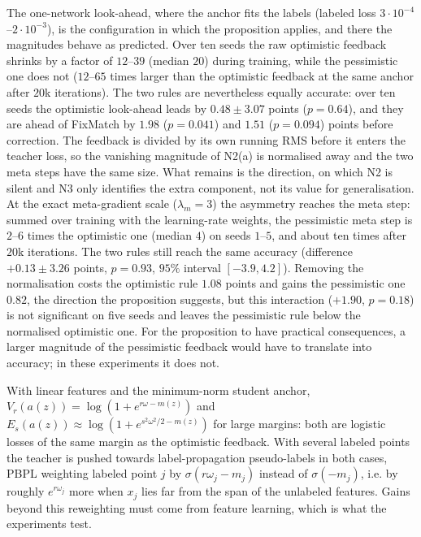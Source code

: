 The one-network look-ahead, where the anchor fits the labels (labeled loss
$3\cdot10^{-4}$--$2\cdot10^{-3}$), is the configuration in which the proposition applies, and
there the magnitudes behave as predicted. Over ten seeds the raw optimistic feedback shrinks by a
factor of $12$--$39$ (median $20$) during training, while the pessimistic one does not
($12$--$65$ times larger than the optimistic feedback at the same anchor after $20$k
iterations). The two rules are nevertheless equally accurate: over ten seeds the optimistic
look-ahead leads by $0.48\pm3.07$ points ($p=0.64$), and they are ahead of FixMatch by $1.98$
($p=0.041$) and $1.51$ ($p=0.094$) points before correction. The feedback is divided by its own
running RMS before it enters the teacher loss, so the vanishing magnitude of N2(a) is normalised
away and the two meta steps have the same size. What remains is the direction, on which N2 is
silent and N3 only identifies the extra component, not its value for generalisation. At the
exact meta-gradient scale ($\lambda_m=3$) the asymmetry reaches the meta step: summed over
training with the learning-rate weights, the pessimistic meta step is $2$--$6$ times the
optimistic one (median $4$) on seeds $1$--$5$, and about ten times after $20$k iterations. The
two rules still reach the same accuracy (difference $+0.13\pm3.26$ points, $p=0.93$, $95\%$
interval $[-3.9,4.2]$). Removing the normalisation costs the optimistic rule $1.08$ points and
gains the pessimistic one $0.82$, the direction the proposition suggests, but this interaction
($+1.90$, $p=0.18$) is not significant on five seeds and leaves the pessimistic rule below the
normalised optimistic one. For the proposition to have practical consequences, a larger
magnitude of the pessimistic feedback would have to translate into accuracy; in these
experiments it does not.

\begin{remark}
With linear features and the minimum-norm student anchor, $V_r(a(z))=\log(1+e^{r\omega-m(z)})$
and $E_s(a(z))\approx\log(1+e^{s^2\omega^2/2-m(z)})$ for large margins: both are logistic
losses of the same margin as the optimistic feedback. With several labeled points the
teacher is pushed towards label-propagation pseudo-labels in both cases, PBPL weighting
labeled point $j$ by $\sigma(r\omega_j-m_j)$ instead of $\sigma(-m_j)$, i.e. by roughly
$e^{r\omega_j}$ more when $x_j$ lies far from the span of the unlabeled features. Gains beyond
this reweighting must come from feature learning, which is what the experiments test.
\end{remark}

